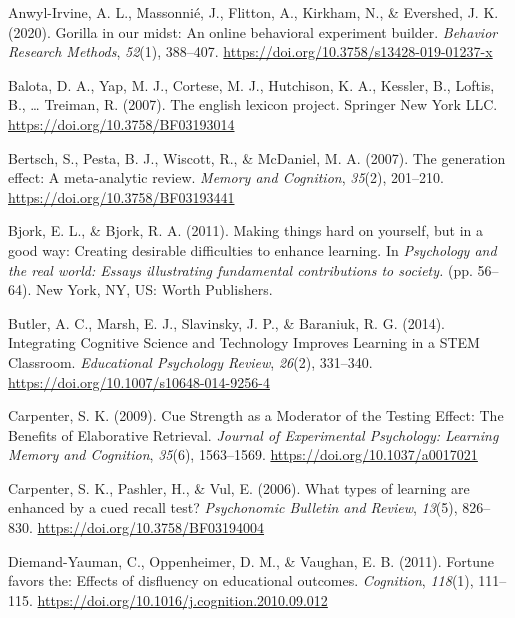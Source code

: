 \documentclass[
  english,
  jou]{apa6}
\begin{document}
\hypertarget{refs}{}
\leavevmode\hypertarget{ref-Anwyl-Irvine2020}{}%
Anwyl-Irvine, A. L., Massonnié, J., Flitton, A., Kirkham, N., \& Evershed, J. K. (2020). Gorilla in our midst: An online behavioral experiment builder. \emph{Behavior Research Methods}, \emph{52}(1), 388--407. \url{https://doi.org/10.3758/s13428-019-01237-x}

\leavevmode\hypertarget{ref-Balota2007}{}%
Balota, D. A., Yap, M. J., Cortese, M. J., Hutchison, K. A., Kessler, B., Loftis, B., \ldots{} Treiman, R. (2007). The english lexicon project. Springer New York LLC. \url{https://doi.org/10.3758/BF03193014}

\leavevmode\hypertarget{ref-Bertsch2007}{}%
Bertsch, S., Pesta, B. J., Wiscott, R., \& McDaniel, M. A. (2007). The generation effect: A meta-analytic review. \emph{Memory and Cognition}, \emph{35}(2), 201--210. \url{https://doi.org/10.3758/BF03193441}

\leavevmode\hypertarget{ref-Bjork2011}{}%
Bjork, E. L., \& Bjork, R. A. (2011). Making things hard on yourself, but in a good way: Creating desirable difficulties to enhance learning. In \emph{Psychology and the real world: Essays illustrating fundamental contributions to society.} (pp. 56--64). New York, NY, US: Worth Publishers.

\leavevmode\hypertarget{ref-Butler2014}{}%
Butler, A. C., Marsh, E. J., Slavinsky, J. P., \& Baraniuk, R. G. (2014). Integrating Cognitive Science and Technology Improves Learning in a STEM Classroom. \emph{Educational Psychology Review}, \emph{26}(2), 331--340. \url{https://doi.org/10.1007/s10648-014-9256-4}

\leavevmode\hypertarget{ref-Carpenter2009}{}%
Carpenter, S. K. (2009). Cue Strength as a Moderator of the Testing Effect: The Benefits of Elaborative Retrieval. \emph{Journal of Experimental Psychology: Learning Memory and Cognition}, \emph{35}(6), 1563--1569. \url{https://doi.org/10.1037/a0017021}

\leavevmode\hypertarget{ref-Carpenter2006}{}%
Carpenter, S. K., Pashler, H., \& Vul, E. (2006). What types of learning are enhanced by a cued recall test? \emph{Psychonomic Bulletin and Review}, \emph{13}(5), 826--830. \url{https://doi.org/10.3758/BF03194004}

\leavevmode\hypertarget{ref-Diemand-Yauman2011}{}%
Diemand-Yauman, C., Oppenheimer, D. M., \& Vaughan, E. B. (2011). Fortune favors the: Effects of disfluency on educational outcomes. \emph{Cognition}, \emph{118}(1), 111--115. \url{https://doi.org/10.1016/j.cognition.2010.09.012}
\end{document}
